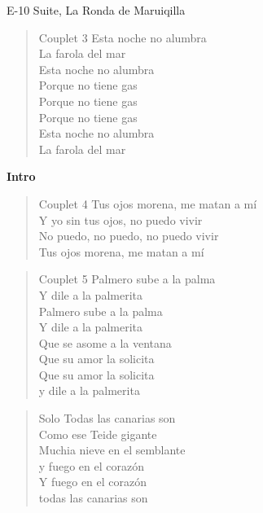 \begin{song}[vals]{E-10 Suite, La Ronda de Maruiqilla}
\begin{verse}{Couplet 3}
\chord{}Esta noche no alumbra\\
La farola del mar\\
\chord{}Esta noche no alumbra\\
Porque no tiene gas\\
\chord{}Porque no tiene gas\\
\chord{}Porque no tiene gas\\
\chord{}Esta noche no alumbra\\
La farola del mar\\
\end{verse}
\textbf{Intro}\\
\begin{verse}{Couplet 4}
\chord{}Tus ojos morena, me matan a mí\\
\chord{}Y yo sin tus ojos, no puedo vivir \\
No puedo, no puedo, no puedo vivir\\
\chord{}Tus ojos morena, me matan a mí\\
\end{verse}

\begin{verse}{Couplet 5}
Palmero sube a la palma\\
Y dile a la palmerita\\
Palmero sube a la palma\\
Y dile a la palmerita\\
Que se asome a la ventana\\
Que su amor la solicita\\
Que su amor la solicita\\
y dile a la palmerita\\
\end{verse}

\begin{verse}{Solo}
Todas las canarias son\\
Como ese Teide gigante\\
Muchia nieve en el semblante\\
y fuego en el corazón\\
Y fuego en el corazón\\
todas las canarias son\\
\end{verse}


\end{song}
